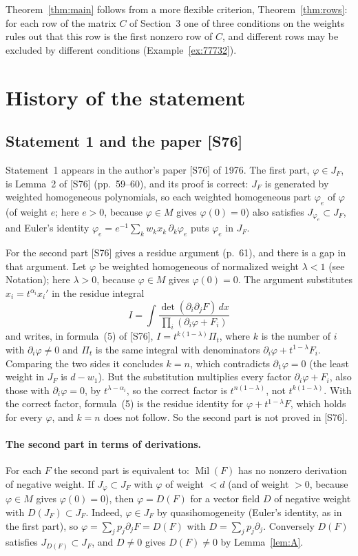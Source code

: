 \documentclass[11pt]{article}
\newcommand{\Mil}{\operatorname{Mil}(F)}
\theoremstyle{remark}
\begin{document}
Theorem~\ref{thm:main} follows from a more flexible criterion, Theorem~\ref{thm:rows}: for each row of the matrix $C$ of Section~3 one of three conditions on the weights rules out that this row is the first nonzero row of $C$, and different rows may be excluded by different conditions (Example~\ref{ex:77732}).

\section{History of the statement}

\subsection{Statement 1 and the paper [S76]}

Statement~1 appears in the author's paper [S76] of 1976. The first part, $\varphi\in J_F$, is Lemma~2 of [S76] (pp.~59--60), and its proof is correct: $J_F$ is generated by weighted homogeneous polynomials, so each weighted homogeneous part $\varphi_e$ of $\varphi$ (of weight $e$; here $e>0$, because $\varphi\in M$ gives $\varphi(0)=0$) also satisfies $J_{\varphi_e}\subset J_F$, and Euler's identity $\varphi_e=e^{-1}\sum_kw_kx_k\,\partial_k\varphi_e$ puts $\varphi_e$ in $J_F$.

For the second part [S76] gives a residue argument (p.~61), and there is a gap in that argument. Let $\varphi$ be weighted homogeneous of normalized weight $\lambda<1$ (see Notation); here $\lambda>0$, because $\varphi\in M$ gives $\varphi(0)=0$. The argument substitutes $x_i=t^{\alpha_i}x_i'$ in the residue integral
\[
I=\int\frac{\det(\partial_i\partial_jF)\,dx}{\prod_i(\partial_i\varphi+F_i)}
\]
and writes, in formula~(5) of [S76], $I=t^{k(1-\lambda)}\Pi_t$, where $k$ is the number of $i$ with $\partial_i\varphi\ne0$ and $\Pi_t$ is the same integral with denominators $\partial_i\varphi+t^{1-\lambda}F_i$. Comparing the two sides it concludes $k=n$, which contradicts $\partial_1\varphi=0$ (the least weight in $J_F$ is $d-w_1$). But the substitution multiplies every factor $\partial_i\varphi+F_i$, also those with $\partial_i\varphi=0$, by $t^{\lambda-\alpha_i}$, so the correct factor is $t^{n(1-\lambda)}$, not $t^{k(1-\lambda)}$. With the correct factor, formula~(5) is the residue identity for $\varphi+t^{1-\lambda}F$, which holds for every $\varphi$, and $k=n$ does not follow. So the second part is not proved in [S76].

\paragraph{The second part in terms of derivations.} For each $F$ the second part is equivalent to: $\Mil$ has no nonzero derivation of negative weight. If $J_\varphi\subset J_F$ with $\varphi$ of weight $<d$ (and of weight $>0$, because $\varphi\in M$ gives $\varphi(0)=0$), then $\varphi=D(F)$ for a vector field $D$ of negative weight with $D(J_F)\subset J_F$. Indeed, $\varphi\in J_F$ by quasihomogeneity (Euler's identity, as in the first part), so $\varphi=\sum_jp_j\partial_jF=D(F)$ with $D=\sum_jp_j\partial_j$. Conversely $D(F)$ satisfies $J_{D(F)}\subset J_F$, and $D\ne0$ gives $D(F)\ne0$ by Lemma~\ref{lem:A}.
\end{document}
